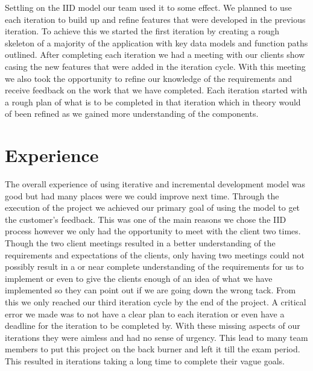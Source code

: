 \documentclass{style/CRPITStyle}
\begin{document}
\vspace{.1in}

Settling on the IID model our team used it to some effect.
We planned to use each iteration to build up and refine features that were
developed in the previous iteration. To achieve this we started the first
iteration by creating a rough skeleton of a majority of the application with key
data models and function paths outlined.
After completing each iteration we had a meeting with our clients show casing the
new features that were added in the iteration cycle. With this meeting we also
took the opportunity to refine our knowledge of the requirements and receive
feedback on the work that we have completed.
Each iteration started with a rough plan of what is to be completed in that
iteration which in theory would of been refined as we gained more understanding
of the components.

\section{Experience}

The overall experience of using iterative and incremental development model was
good but had many places were we could improve next time. Through the
execution of the project we achieved our primary goal of using the model to get
the customer's feedback. This was one of the main reasons we chose the IID
process however we only had the opportunity to meet with the client two times.
Though the two client meetings resulted in a better understanding of the
requirements and expectations of the clients, only having two meetings
could not possibly result in a or near complete understanding of the
requirements for us to implement or even to give the clients enough of an idea of
what we have implemented so they can point out if we are going down the wrong
tack.
From this we only reached our third iteration cycle by the end of the project.
A critical error we made was to not have a clear plan to each iteration or even
have a deadline for the iteration to be completed by. With these missing aspects
of our iterations they were aimless and had no sense of urgency. This lead to
many team members to put this project on the back burner and left it till the
exam period. This resulted in iterations taking a long time to complete their
vague goals.
\end{document}
